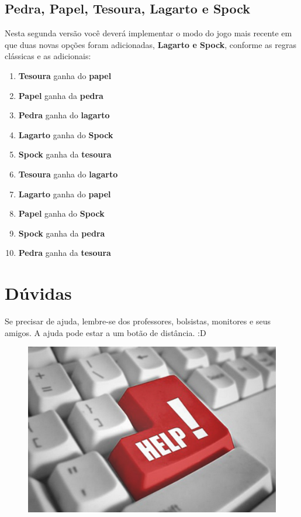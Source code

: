 \documentclass[12pt]{article}
\begin{document}
\subsection{Pedra, Papel, Tesoura, Lagarto e Spock}
Nesta segunda versão você deverá implementar o modo do jogo mais recente em que duas novas opções foram adicionadas, \textbf{Lagarto e Spock}, conforme as regras clássicas e as adicionais:

\begin{enumerate}
  \item \textbf{Tesoura} ganha do \textbf{papel}
  \item \textbf{Papel} ganha da \textbf{pedra}
  \item \textbf{Pedra} ganha do \textbf{lagarto}
  \item \textbf{Lagarto} ganha do \textbf{Spock}
  \item \textbf{Spock} ganha da \textbf{tesoura}
  \item \textbf{Tesoura} ganha do \textbf{lagarto}
  \item \textbf{Lagarto} ganha do \textbf{papel}
  \item \textbf{Papel} ganha do \textbf{Spock}
  \item \textbf{Spock} ganha da \textbf{pedra}
  \item \textbf{Pedra} ganha da \textbf{tesoura}
\end{enumerate}

\section{Dúvidas}
Se precisar de ajuda, lembre-se dos professores, bolsistas, monitores e seus amigos.
A ajuda pode estar a um botão de distância. :D

\begin{figure}[h!]
\centering
\includegraphics[width=0.4\linewidth]{./imagens/help}
\end{figure}
\end{document}

